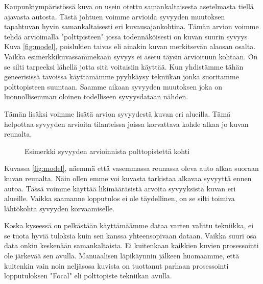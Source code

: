 Kaupunkiympäristössä kuva on usein otettu samankaltaisesta asetelmasta tiellä ajavasta autosta. 
Tästä johtuen voimme arvioida syvyyden muutoksen tapahtuvan hyvin samankaltaisesti eri kuvausajankohtina.
Tämän arvion voimme tehdä arvioimalla "polttpisteen" jossa todennäköisesti on kuvan suurin syvyys Kuva \ref{fig:model},
poislukien taivas eli ainakin kuvan merkitsevän alaosan osalta. Vaikka esimerkkikuvassammekaan syvyys ei asetu täysin arvioituun kohtaan.
On se silti tarpeeksi lähellä jotta sitä voitaisiin käyttää. 
Kun yhdistämme tähän geneerisissä tavoissa käyttämämme pyyhkäysy tekniikan jonka suoritamme polttopisteen suuntaan.
Saamme aikaan syvyyden muutoksen joka on luonnollisemman oloinen todelliseen syvyysdataan nähden.

Tämän lisäksi voimme lisätä arvion syvyydestä kuvan eri alueilla. 
Tämä helpottaa syvyyden arvioita tilanteissa joissa korvattava kohde alkaa jo kuvan reunalta.

\begin{figure}[h]
\centering
{}
\caption{Esimerkki syvyyden arvioinnista polttopistettä kohti}
\label{fig:polttopiste_2}
\end{figure}
    
Kuvassa \ref{fig:model}, näemmä että vasemmassa reunassa oleva auto alkaa suoraan kuvan reunalta.
Näin ollen emme voi kuvasta tarkistaa alkavaa syvyyttä ennen autoa.
Tässä voimme käyttää likimääräsistä arvoita syvyyksistä kuvan eri alueille. Vaikka saamanne lopputulos ei ole täydellinen,
on se silti toimiva lähtökohta syvyyden korvaamiselle.

Koska kyseessä on pelkästään käyttämäämme dataa varten valittu tekniikka, ei se tuota hyviä tuloksia kuin sen kanssa yhteensopivaan dataan.
Vaikka suuri osa data onkin keskenään samankaltaista. Ei kuitenkaan kaikkien kuvien prosessointi ole järkevää sen avulla.
Manuaalisen läpikäynnin jälkeen huomaamme, että kuitenkin vain noin neljäsosa kuvista on tuottanut parhaan prosessointi lopputuloksen "Focal" eli polttopiste tekniikan avulla. 

